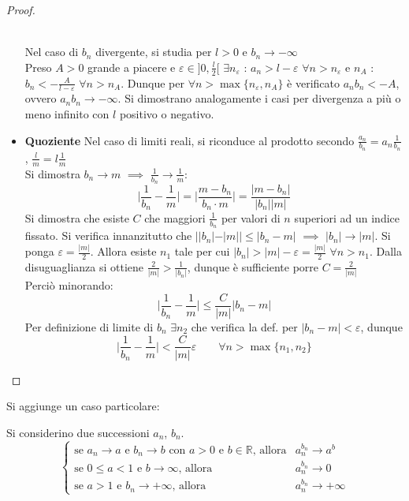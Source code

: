 \documentclass[10pt, oneside]{book}
\theoremstyle{plain}
\begin{document}
\begin{proof}
\begin{itemize}
    \\Nel caso di $b_n$ divergente, si studia per $l>0$ e $b_n \rightarrow -\infty$
    \\Preso $A>0$ grande a piacere e $\varepsilon \in ]0, \frac{l}{2}[$ $\exists n_\varepsilon$ : $a_n > l - \varepsilon$ $\forall n > n_\varepsilon$ e $n_A$ : $b_n < - \frac{A}{l - \varepsilon}$ $\forall n > n_A$.
    Dunque per $\forall n > \max \{n_\varepsilon, n_A\}$ è verificato $a_n b_n < -A$, ovvero $a_n b_n \rightarrow - \infty$. Si dimostrano analogamente i casi per divergenza a più o meno infinito con $l$ positivo o negativo.
    \item \textbf{Quoziente} Nel caso di limiti reali, si riconduce al prodotto secondo $\frac{a_n}{b_n} = a_n \frac{1}{b_n}$, $\frac{l}{m} = l \frac{1}{m}$
    \\Si dimostra $b_n \rightarrow m$ $\implies$ $\frac{1}{b_n} \rightarrow \frac{1}{m}$: 
    \[\bigg| \frac{1}{b_n} - \frac{1}{m}\bigg| = \bigg| \frac{m - b_n}{b_n \cdot m} \bigg| = \frac{|m - b_n|}{|b_n||m|}\]
    Si dimostra che esiste $C$ che maggiori $\frac{1}{b_n}$ per valori di $n$ superiori ad un indice fissato. Si verifica innanzitutto che $||b_n| - |m|| \leq |b_n - m|$ $\implies$ $|b_n| \rightarrow |m|$. Si ponga $\varepsilon = \frac{|m|}{2}$. Allora esiste $n_1$ tale per cui $\displaystyle |b_n| > |m| - \varepsilon = \frac{|m|}{2}$ $\forall n > n_1$. Dalla disuguaglianza si ottiene $\displaystyle \frac{2}{|m|} > \frac{1}{|b_n|}$, dunque è sufficiente porre $C = \frac{2}{|m|}$
    \\Perciò minorando:
    \[\bigg| \frac{1}{b_n} - \frac{1}{m}\bigg| \leq \frac{C}{|m|} |b_n - m|\]
    Per definizione di limite di $b_n$ $\exists n_2$ che verifica la def. per $|b_n - m| < \varepsilon$, dunque 
    \[\bigg| \frac{1}{b_n} - \frac{1}{m}\bigg| < \frac{C}{|m|}\varepsilon \qquad \forall n > \max \{n_1, n_2\}\]
    \end{itemize}
\end{proof}

Si aggiunge un caso particolare:
\begin{prop}
    Si considerino due successioni $a_n$, $b_n$.
        \[\begin{cases} \textrm{se $a_n \rightarrow a$ e $b_n \rightarrow b$ con $a > 0$ e $b \in \mathbb{R}$, allora} & 
        a_n^{b_n} \rightarrow a^b\\
        \textrm{se $0 \leq a < 1$ e $b \rightarrow \infty$, allora}
        & a_n^{b_n} \rightarrow 0\\
        \textrm{se $a > 1$ e $b_n \rightarrow + \infty$, allora}
        & a_n^{b_n} \rightarrow + \infty
    \end{cases}\]
\end{prop}
\end{document}
